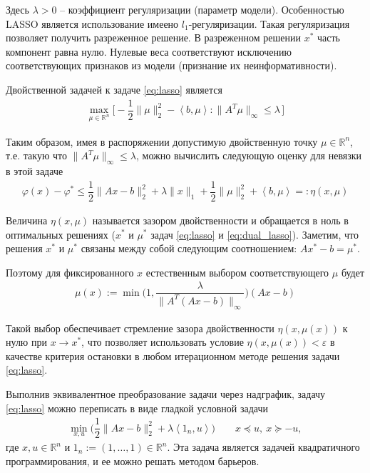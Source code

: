 \documentclass[%
	11pt,
	a4paper,
	utf8,
		]{article}
\begin{document}
Здесь $ \lambda > 0 $ -- коэффициент регуляризации (параметр модели). Особенностью LASSO является использование имеено $ l_1 $-регуляризации. Такая регуляризация позволяет получить разреженное решение. В разреженном решении $ x^{*} $ часть компонент равна нулю. Нулевые веса соответствуют исключению соответствующих признаков из модели (признание их неинформативности).

Двойственной задачей к  задаче \eqref{eq:lasso} является
\begin{align*}\label{eq:dual_lasso}
	\max_{ \mu \in \mathbb{R}^n } \big[ - \dfrac{1}{2} \| \mu \|_2^2 - \left< b, \mu \right>: \| A^T \mu \|_{\infty} \leqslant \lambda \,\big]
\end{align*}

Таким образом, имея в распоряжении допустимую двойственную точку $ \mu \in \mathbb{R}^n $, т.е. такую что $ \| A^T \mu \|_{\infty} \leqslant \lambda $, можно вычислить следующую оценку для невязки в этой задаче
\begin{align}
	\varphi (x) - \varphi^{*} \leqslant \dfrac{1}{2} \| Ax - b \|_2^2 + \lambda \| x \|_1 + \dfrac{1}{2} \| \mu \|_2^2 + \left< b, \mu \right> =: \eta(x, \mu)
\end{align}

Величина $ \eta{(x, \mu)} $ называется зазором двойственности и обращается в ноль в оптимальных решениях ($ x^{*} $ и $ \mu^{*} $ задач \eqref{eq:lasso} и \eqref{eq:dual_lasso}). Заметим, что решения $ x^{*} $ и $ \mu^{*} $ связаны между собой следующим соотношением: $ A x^{*} - b = \mu^{*} $. 

Поэтому для фиксированного $ x $ естественным выбором соответствующего $ \mu $ будет
\begin{align*}
	\mu(x) := \min \Bigg(1, \dfrac{\lambda}{ \| A^T (A x - b) \|_{\infty} } \Bigg) (Ax - b)
\end{align*}

Такой выбор обеспечивает стремление зазора двойственности $ \eta(x, \mu(x)) $ к нулю при $ x \rightarrow x^{*} $, что позволяет использовать условие $ \eta (x, \mu(x)) < \varepsilon $ в качестве критерия остановки в любом итерационном методе решения задачи \eqref{eq:lasso}.

Выполнив эквивалентное преобразование задачи через надграфик, задачу \eqref{eq:lasso} можно переписать в виде гладкой условной задачи
\begin{align*}
	\min_{x, u} \bigg( \dfrac{1}{2} \| Ax - b\|_2^2 + \lambda \left< 1_n, u \right> \bigg) \qquad x \preceq u, \ x \succeq - u,
\end{align*}
где $ x, u \in \mathbb{R}^n $ и $ 1_n := (1, \ldots, 1) \in \mathbb{R}^n $. Эта задача является задачей квадратичного программирования, и ее можно решать методом барьеров.
\end{document}
